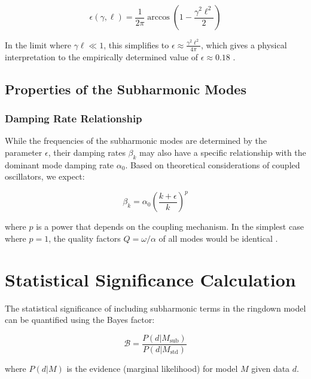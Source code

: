 \documentclass[a4paper,12pt]{article}
\begin{document}
\begin{equation}
\epsilon(\gamma, \ell) = \frac{1}{2\pi}\arccos\left(1 - \frac{\gamma^2 \ell^2}{2}\right)
\end{equation}

In the limit where $\gamma \ell \ll 1$, this simplifies to $\epsilon \approx \frac{\gamma^2 \ell^2}{4\pi}$, which gives a physical interpretation to the empirically determined value of $\epsilon \approx 0.18$ \cite{abbott2016observation}.

\subsection{Properties of the Subharmonic Modes}
\label{subsec:subharmonic_properties}

\subsubsection{Damping Rate Relationship}

While the frequencies of the subharmonic modes are determined by the parameter $\epsilon$, their damping rates $\beta_k$ may also have a specific relationship with the dominant mode damping rate $\alpha_0$. Based on theoretical considerations of coupled oscillators, we expect:

\begin{equation}
\beta_k = \alpha_0 \left(\frac{k + \epsilon}{k}\right)^p
\end{equation}

where $p$ is a power that depends on the coupling mechanism. In the simplest case where $p=1$, the quality factors $Q = \omega/\alpha$ of all modes would be identical \cite{isi2019testing}.

\section{Statistical Significance Calculation}
\label{sec:statistical_significance}

The statistical significance of including subharmonic terms in the ringdown model can be quantified using the Bayes factor:

\begin{equation}
\mathcal{B} = \frac{P(d|M_\textrm{sub})}{P(d|M_\textrm{std})}
\end{equation}

where $P(d|M)$ is the evidence (marginal likelihood) for model $M$ given data $d$.
\end{document}
